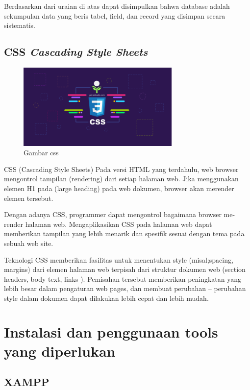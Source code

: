 Berdasarkan dari uraian di atas dapat disimpulkan bahwa database adalah sekumpulan data yang beris tabel, field, dan record yang disimpan secara sistematis.

\subsection{CSS \textit{Cascading Style Sheets}}
	\begin{figure}[H]
		\includegraphics[width=8cm]{figures/css.png}
		\centering
		\caption{Gambar css}
	\end{figure}
CSS (Cascading Style Sheets)  Pada versi HTML yang terdahulu, web browser mengontrol  tampilan (rendering) dari setiap halaman web.  Jika menggunakan  elemen H1 pada (large heading) pada web dokumen, browser akan merender elemen tersebut.  

Dengan adanya CSS, programmer dapat mengontrol bagaimana browser me-render halaman web.  Mengaplikasikan CSS pada halaman web dapat memberikan tampilan yang lebih menarik dan spesifik sesuai dengan tema pada sebuah web site.  

Teknologi CSS memberikan fasilitas untuk menentukan style (misal;spacing, margins) dari elemen halaman  web terpisah dari struktur dokumen web (section headers, body text, links ).  Pemisahan tersebut memberikan peningkatan yang lebih besar dalam pengaturan web pages, dan membuat perubahan – perubahan style dalam dokumen dapat dilakukan lebih cepat dan lebih mudah. 


\section{Instalasi dan penggunaan tools yang diperlukan}
\subsection{XAMPP}
